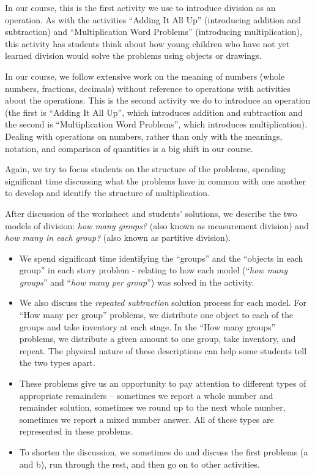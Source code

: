\documentclass{ximera}
\begin{document}
\newpage

\begin{instructorNotes}
In our course, this is the first activity we use to introduce division as an operation.  As with the activities ``Adding It All Up'' (introducing addition and subtraction) and ``Multiplication Word Problems'' (introducing multiplication), this activity has students think about how young children who have not yet learned division would solve the problems using objects or drawings.

In our course, we follow extensive work on the meaning of numbers (whole numbers, fractions, decimals) without reference to operations with activities about the operations.  This is the second activity we do to introduce an operation (the first is ``Adding It All Up'', which introduces addition and subtraction and the second is ``Multiplication Word Problems'', which introduces multiplication). Dealing with operations on numbers, rather than only with the meanings, notation, and comparison of quantities is a big shift in our course.

Again, we try to focus students on the structure of the problems, spending significant time discussing what the problems have in common with one another to develop and identify the structure of multiplication.

After discussion of the worksheet and students' solutions, we describe the two models of division: {\em how many groups?} (also known as measurement division) and {\em how many in each group? } (also known as partitive division).

\begin{itemize}
	\item We spend significant time identifying the ``groups'' and the ``objects in each group'' in each story problem - relating to how each model (``{\em how many groups}'' and ``{\em how many per group}'') was solved in the activity.
	\item We also discuss the {\em repeated subtraction} solution process for each model.  For ``How many per group'' problems, we distribute one object to each of the groups and take inventory at each stage.  In the ``How many groups'' problems, we distribute a given amount to one group, take inventory, and repeat.  The physical nature of these descriptions can help some students tell the two types apart.  %
	\item These problems give us an opportunity to pay attention to different types of appropriate remainders -- sometimes we report a whole number and remainder solution, sometimes we round up to the next whole number, sometimes we report a mixed number answer.  All of these types are represented in these problems. 
    \item To shorten the discussion, we sometimes do and discuss the first problems (a and b), run through the rest, and then go on to other activities.
\end{itemize}




\end{instructorNotes}
\end{document}
